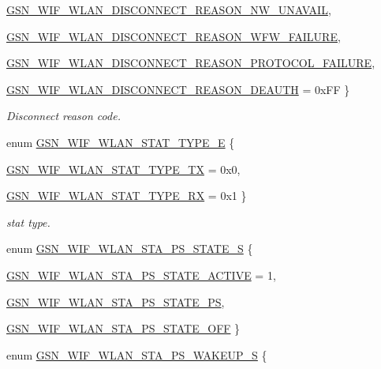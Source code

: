 \begin{DoxyCompactItemize}
\par
\hyperlink{a00640_gga9dd854d0108dc49ff077a04e897e3518a969801072b56d9aa2eb6298b7d79d6fd}{GSN\_\-WIF\_\-WLAN\_\-DISCONNECT\_\-REASON\_\-NW\_\-UNAVAIL}, 
\par
\hyperlink{a00640_gga9dd854d0108dc49ff077a04e897e3518a6e04b4bfeb58c31b2b515f7919275cba}{GSN\_\-WIF\_\-WLAN\_\-DISCONNECT\_\-REASON\_\-WFW\_\-FAILURE}, 
\par
\hyperlink{a00640_gga9dd854d0108dc49ff077a04e897e3518ae0b2465fb829477650a95f708deff7fe}{GSN\_\-WIF\_\-WLAN\_\-DISCONNECT\_\-REASON\_\-PROTOCOL\_\-FAILURE}, 
\par
\hyperlink{a00640_gga9dd854d0108dc49ff077a04e897e3518aedf74ad09bfdcfc5b39c5a36afe860df}{GSN\_\-WIF\_\-WLAN\_\-DISCONNECT\_\-REASON\_\-DEAUTH} = 0xFF
 \}
\begin{DoxyCompactList}\small\item\em Disconnect reason code. \end{DoxyCompactList}\item 
enum \hyperlink{a00677_ga1ea7ef2124a3ae886d909d6b8188ef79}{GSN\_\-WIF\_\-WLAN\_\-STAT\_\-TYPE\_\-E} \{ \par
\hyperlink{a00640_gga1ea7ef2124a3ae886d909d6b8188ef79a04b02ff9d7f0704e049d050172be3433}{GSN\_\-WIF\_\-WLAN\_\-STAT\_\-TYPE\_\-TX} =  0x0, 
\par
\hyperlink{a00640_gga1ea7ef2124a3ae886d909d6b8188ef79a9b06475a178a05d5fea8e190e34e8e08}{GSN\_\-WIF\_\-WLAN\_\-STAT\_\-TYPE\_\-RX} =  0x1
 \}
\begin{DoxyCompactList}\small\item\em stat type. \end{DoxyCompactList}\item 
enum \hyperlink{a00677_gacdd46642c1bc32323d14e63794ffc1b3}{GSN\_\-WIF\_\-WLAN\_\-STA\_\-PS\_\-STATE\_\-S} \{ \par
\hyperlink{a00677_gacdd46642c1bc32323d14e63794ffc1b3a022f4261937d6f0aaca2fb80711bbdab}{GSN\_\-WIF\_\-WLAN\_\-STA\_\-PS\_\-STATE\_\-ACTIVE} = 1, 
\par
\hyperlink{a00677_gacdd46642c1bc32323d14e63794ffc1b3ad3cc5d691f757517adb594be62d9d1f2}{GSN\_\-WIF\_\-WLAN\_\-STA\_\-PS\_\-STATE\_\-PS}, 
\par
\hyperlink{a00677_gacdd46642c1bc32323d14e63794ffc1b3a499f7f6ba458ace7bf58b337f04691b1}{GSN\_\-WIF\_\-WLAN\_\-STA\_\-PS\_\-STATE\_\-OFF}
 \}
\item 
enum \hyperlink{a00677_ga37d0f17a3334d0645a337ca71c7c9bcb}{GSN\_\-WIF\_\-WLAN\_\-STA\_\-PS\_\-WAKEUP\_\-S} \{ \par

\end{DoxyCompactItemize}
